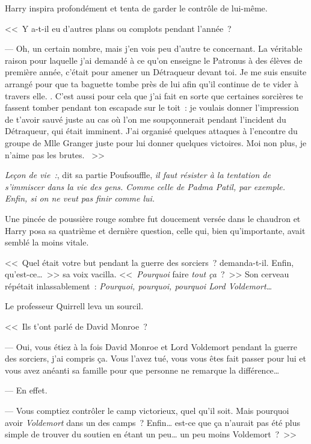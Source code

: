 Harry inspira profondément et tenta de garder le contrôle de lui-même.

<<~Y a-t-il eu d'autres plans ou complots pendant l'année~?

--- Oh, un certain nombre, mais j'en vois peu d'autre te concernant. La véritable raison pour laquelle j'ai demandé à ce qu'on enseigne le Patronus à des élèves de première année, c'était pour amener un Détraqueur devant toi. Je me suis ensuite arrangé pour que ta baguette tombe près de lui afin qu'il continue de te vider à travers elle. . C'est aussi pour cela que j'ai fait en sorte que certaines sorcières te fassent tomber pendant ton escapade sur le toit~: je voulais donner l'impression de t'avoir sauvé juste au cas où l'on me soupçonnerait pendant l'incident du Détraqueur, qui était imminent.  J'ai organisé quelques attaques à l'encontre du groupe de Mlle Granger juste pour lui donner quelques victoires. Moi non plus, je n'aime pas les brutes. ~>>

\emph{Leçon de vie~:}, dit sa partie Poufsouffle, \emph{il faut résister à la tentation de s'immiscer dans la vie des gens. Comme celle de Padma Patil, par exemple. Enfin, si on ne veut pas finir comme lui.}

Une pincée de poussière rouge sombre fut doucement versée dans le chaudron et Harry posa sa quatrième et dernière question, celle qui, bien qu'importante, avait semblé la moins vitale.

<<~Quel était votre but pendant la guerre des sorciers~? demanda-t-il. Enfin, qu'est-ce…~>> sa voix vacilla. <<~\emph{Pourquoi} faire \emph{tout ça}~?~>> Son cerveau répétait inlassablement~: \emph{Pourquoi, pourquoi, pourquoi Lord Voldemort…}

Le professeur Quirrell leva un sourcil.

<<~Ils t'ont parlé de David Monroe~?

--- Oui, vous étiez à la fois David Monroe et Lord Voldemort pendant la guerre des sorciers, j'ai compris ça. Vous l'avez tué, vous vous êtes fait passer pour lui et vous avez anéanti sa famille pour que personne ne remarque la différence…

--- En effet.

--- Vous comptiez contrôler le camp victorieux, quel qu'il soit. Mais pourquoi avoir \emph{Voldemort} dans un des camps~? Enfin… est-ce que ça n'aurait pas été plus simple de trouver du soutien en étant un peu… un peu moins Voldemort~?~>>

